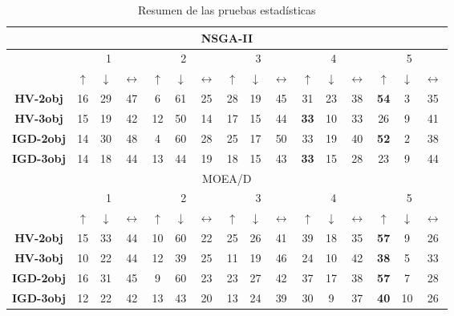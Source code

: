 \begin{table}[t]
\centering
\caption{Resumen de las pruebas estadísticas}
\label{tab:statistical_Tests}
\begin{scriptsize}
\begin{tabular}{|c|c|c|c|c|c|c|c|c|c|c|c|c|c|c|c|}
\hline
\multicolumn{16}{|c|}{NSGA-II} \\ \hline
 & \multicolumn{3}{c|}{1} & \multicolumn{3}{c|}{2} & \multicolumn{3}{c|}{3} & \multicolumn{3}{c|}{4} & \multicolumn{3}{c|}{5} \\ \hline
 & $\uparrow$ & $\downarrow$ & $\longleftrightarrow$ & $\uparrow$ & $\downarrow$ & $\longleftrightarrow$ & $\uparrow$ & $\downarrow$ & $\longleftrightarrow$ & $\uparrow$ & $\downarrow$ & $\longleftrightarrow$ & $\uparrow$ & $\downarrow$ & $\longleftrightarrow$ \\ \hline
\textbf{HV-2obj} & 16 & 29 & 47 & 6 & 61 & 25 & 28 & 19 & 45 & 31 & 23 & 38 & \textbf{54} & 3 & 35 \\ \hline
\textbf{HV-3obj} & 15 & 19 & 42 & 12 & 50 & 14 & 17 & 15 & 44 & \textbf{33} & 10 & 33 & 26 & 9 & 41 \\ \hline
\textbf{IGD-2obj} & 14 & 30 & 48 & 4 & 60 & 28 & 25 & 17 & 50 & 33 & 19 & 40 & \textbf{52} & 2 & 38 \\ \hline
\textbf{IGD-3obj} & 14 & 18 & 44 & 13 & 44 & 19 & 18 & 15 & 43 & \textbf{33} & 15 & 28 & 23 & 9 & 44 \\ \hline

\hline
\hline
\multicolumn{16}{|c|}{MOEA/D} \\ \hline
 & \multicolumn{3}{c|}{1} & \multicolumn{3}{c|}{2} & \multicolumn{3}{c|}{3} & \multicolumn{3}{c|}{4} & \multicolumn{3}{c|}{5} \\ \hline
 & $\uparrow$ & $\downarrow$ & $\longleftrightarrow$ & $\uparrow$ & $\downarrow$ & $\longleftrightarrow$ & $\uparrow$ & $\downarrow$ & $\longleftrightarrow$ & $\uparrow$ & $\downarrow$ & $\longleftrightarrow$ & $\uparrow$ & $\downarrow$ & $\longleftrightarrow$ \\ \hline
\textbf{HV-2obj} & 15 & 33 & 44 & 10 & 60 & 22 & 25 & 26 & 41 & 39 & 18 & 35 & \textbf{57} & 9 & 26 \\ \hline
\textbf{HV-3obj} & 10 & 22 & 44 & 12 & 39 & 25 & 11 & 19 & 46 & 24 & 10 & 42 & \textbf{38} & 5 & 33 \\ \hline
\textbf{IGD-2obj} & 16 & 31 & 45 & 9 & 60 & 23 & 23 & 27 & 42 & 37 & 17 & 38 & \textbf{57} & 7 & 28 \\ \hline
\textbf{IGD-3obj} & 12 & 22 & 42 & 13 & 43 & 20 & 13 & 24 & 39 & 30 & 9 & 37 & \textbf{40} & 10 & 26 \\ \hline


\end{tabular}
\end{scriptsize}
\end{table}
